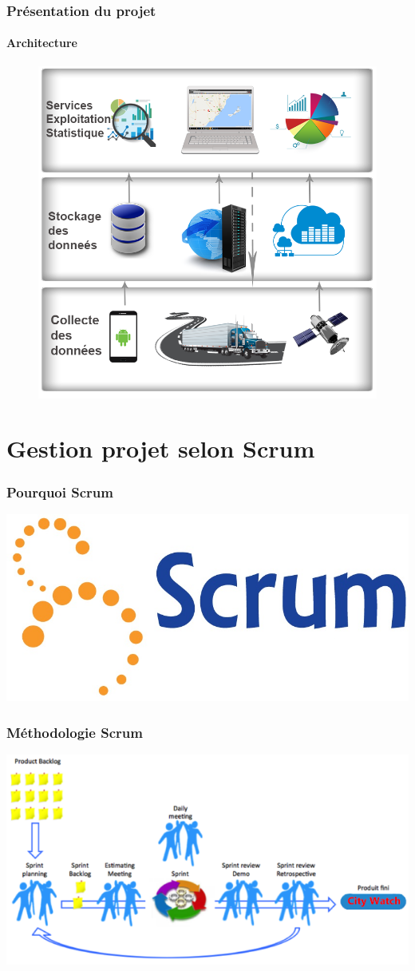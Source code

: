 \documentclass{beamer}
\begin{document}
\begin{frame}
    \frametitle{Présentation du projet}
    \framesubtitle{Architecture}
    \begin{figure}
        \centering
    \includegraphics[width=.73\textwidth]{figures/citywatch-modules.png}
\end{figure}
\end{frame}

\section{Gestion projet selon Scrum}
\begin{frame}
    \frametitle{Pourquoi Scrum}
    \centering
    \includegraphics[width=.7\textwidth]{figures/scrum-logo}
\end{frame}
\begin{frame}
    \frametitle{Méthodologie Scrum}
    \centering
    \includegraphics{figures/scrum-model}
\end{frame}
\end{document}
